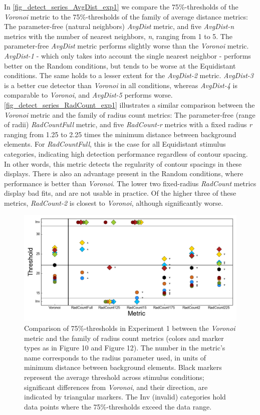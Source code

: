 \documentclass[12pt]{article}
\begin{document}
In \autoref{fig_detect_series_AvgDist_exp1} we compare the 75\%-thresholds of the \emph{Voronoi} metric to the 75\%-thresholds of the family of average distance metrics: The parameter-free (natural neighbors) \emph{AvgDist} metric, and five \emph{AvgDist-n} metrics with the number of nearest neighbors, \emph{n}, ranging from 1 to 5. The parameter-free \emph{AvgDist} metric performs slightly worse than the \emph{Voronoi} metric. \emph{AvgDist-1} - which only takes into account the single nearest neighbor - performs better on the Random conditions, but tends to be worse at the Equidistant conditions. The same holds to a lesser extent for the \emph{AvgDist-2} metric. \emph{AvgDist-3} is a better cue detector than \emph{Voronoi} in all conditions, whereas \emph{AvgDist-4} is comparable to \emph{Voronoi}, and \emph{AvgDist-5} performs worse.\\

\autoref{fig_detect_series_RadCount_exp1} illustrates a similar comparison between the \emph{Voronoi} metric and the family of radius count metrics: The parameter-free (range of radii) \emph{RadCountFull} metric, and five \emph{RadCount-r} metrics with a fixed radius \emph{r} ranging from 1.25 to 2.25 times the minimum distance between background elements. For \emph{RadCountFull}, this is the case for all Equidistant stimulus categories, indicating high detection performance regardless of contour spacing. In other words, this metric detects the regularity of contour spacings in these displays. There is also an advantage present in the Random conditions, where performance is better than \emph{Voronoi}. The lower two fixed-radius \emph{RadCount} metrics display bad fits, and are not usable in practice. Of the higher three of these metrics, \emph{RadCount-2} is closest to \emph{Voronoi}, although significantly worse.

\begin{figure}[h!t]
\includegraphics{Figures/FIG_SUP_detect_series_RadCount_exp1.png}
\caption{Comparison of 75\%-thresholds in Experiment 1 between the \emph{Voronoi} metric and the family of radius count metrics (colors and marker types as in Figure 10 and Figure 12). The number in the metric's name corresponds to the radius parameter used, in units of minimum distance between background elements. Black markers represent the average threshold across stimulus conditions; significant differences from \emph{Voronoi}, and their direction, are indicated by triangular markers. The Inv (invalid) categories hold data points where the 75\%-thresholds exceed the data range.}
\label{fig_detect_series_RadCount_exp1}
\end{figure}
\end{document}
